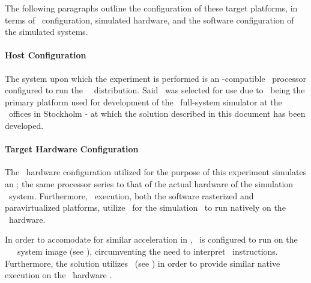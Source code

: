 The following paragraphs outline the configuration of these target platforms, in terms of \dvttermhost\ configuration, simulated hardware, and the software configuration of the simulated systems.

\paragraph{Host Configuration}
\label{par:methodologyexperiment_platformconfiguration_hostconfiguration}
The system upon which the experiment is performed is an \dvttermxeightysix -compatible \dvttermintel\ processor configured to run the \dvttermfedora\ \dvttermlinux\ distribution.
Said \dvttermos\ was selected for use due to \dvttermfedora\ being the primary platform used for development of the \dvttermsimics\ full-system simulator at the \dvttermintel\ offices in Stockholm - at which the solution described in this document has been developed.


\paragraph{Target Hardware Configuration}
\label{par:methodologyexperiment_platformconfiguration:targethardwareconfiguration}
The \dvttermsimics\ hardware configuration utilized for the purpose of this experiment simulates an \dvttermintelcoreiseven ; the same processor series to that of the actual hardware of the simulation \dvttermhost\ system.
Furthermore, \dvttermsimics\ execution, both the software rasterized and paravirtualized platforms, utilize \dvttermkvm\ for the simulation \dvttermtarget\ to run natively on the \dvttermhost\ hardware.

In order to accomodate for similar acceleration in \dvttermqemu , \dvttermandroid\ is configured to run on the \dvttermintel\ \dvttermandroid\ \dvttermxeightysix\ system image (see ), circumventing the need to interpret \dvttermarm\ instructions.
Furthermore, the solution utilizes \dvttermhaxm\ (see ) in order to provide similar native execution on the \dvttermhost\ hardware .

